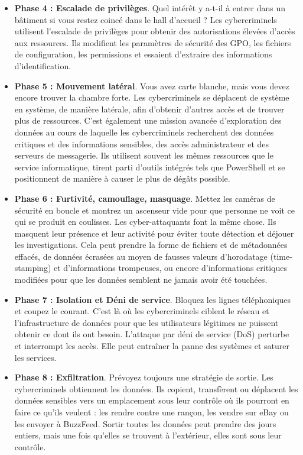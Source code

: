 \begin{itemize}
 \item \textbf{Phase 4 : Escalade de privilèges}. Quel intérêt y a-t-il à entrer dans un bâtiment si vous restez coincé dans le hall d’accueil ? Les cybercriminels utilisent l’escalade de privilèges pour obtenir des autorisations élevées d’accès aux ressources. Ils modifient les paramètres de sécurité des GPO, les fichiers de configuration, les permissions et essaient d’extraire des informations d’identification.

 \item \textbf{Phase 5 : Mouvement latéral}. Vous avez carte blanche, mais vous devez encore trouver la chambre forte. Les cybercriminels se déplacent de système en système, de manière latérale, afin d’obtenir d’autres accès et de trouver plus de ressources. C’est également une mission avancée d’exploration des données au cours de laquelle les cybercriminels recherchent des données critiques et des informations sensibles, des accès administrateur et des serveurs de messagerie. Ils utilisent souvent les mêmes ressources que le service informatique, tirent parti d’outils intégrés tels que PowerShell et se positionnent de manière à causer le plus de dégâts possible.

 \item \textbf{Phase 6 :  Furtivité, camouflage, masquage}. Mettez les caméras de sécurité en boucle et montrez un ascenseur vide pour que personne ne voit ce qui se produit en coulisses. Les cyber-attaquants font la même chose. Ils masquent leur présence et leur activité pour éviter toute détection et déjouer les investigations. Cela peut prendre la forme de fichiers et de métadonnées effacés, de données écrasées au moyen de fausses valeurs d’horodatage (time-stamping) et d’informations trompeuses, ou encore d’informations critiques modifiées pour que les données semblent ne jamais avoir été touchées.

 \item \textbf{Phase 7 :  Isolation et Déni de service}. Bloquez les lignes téléphoniques et coupez le courant. C’est là où les cybercriminels ciblent le réseau et l’infrastructure de données pour que les utilisateurs légitimes ne puissent obtenir ce dont ils ont besoin. L’attaque par déni de service (DoS) perturbe et interrompt les accès. Elle peut entraîner la panne des systèmes et saturer les services.

 \item \textbf{Phase 8 :  Exfiltration}. Prévoyez toujours une stratégie de sortie. Les cybercriminels obtiennent les données. Ils copient, transfèrent ou déplacent les données sensibles vers un emplacement sous leur contrôle où ils pourront en faire ce qu’ils veulent : les rendre contre une rançon, les vendre sur eBay ou les envoyer à BuzzFeed. Sortir toutes les données peut prendre des jours entiers, mais une fois qu’elles se trouvent à l’extérieur, elles sont sous leur contrôle.

\end{itemize}


